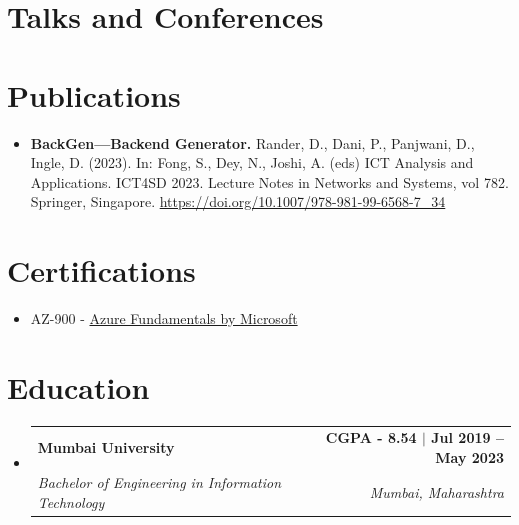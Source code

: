 \documentclass[letterpaper,11pt]{article}
\makeatletter
\newcommand{\resumeItem}[1]{
  \item\small{
    {#1 \vspace{-5pt}}
  }
}
\newcommand{\resumeSubheadingEdu}[4]{
  \vspace{0pt}\item
    \begin{tabular*}{1.0\textwidth}[t]{l@{\extracolsep{\fill}}r}
      \textbf{#1} & \textbf{\small #2} \\
      \textit{\small#3} & \textit{\small #4} \\
    \end{tabular*}\vspace{-9pt}
}
\newcommand{\resumeSubHeadingListStart}{\begin{itemize}[leftmargin=0.0in, label={}]}
\newcommand{\resumeSubHeadingListEnd}{\end{itemize}}
\newcommand{\resumeItemListStart}{\begin{itemize}}
\newcommand{\resumeItemListEnd}{\end{itemize}\vspace{-5pt}}
\makeatother
\begin{document}
\section{Talks and Conferences}
\resumeItemListStart
\resumeItemListEnd
 \vspace{-8pt}

\section{Publications}
\resumeItemListStart
    \resumeItem{\textbf{BackGen—Backend Generator.} Rander, D., Dani, P., Panjwani, D., Ingle, D. (2023). In: Fong, S., Dey, N., Joshi, A. (eds) ICT Analysis and Applications. ICT4SD 2023. Lecture Notes in Networks and Systems, vol 782. Springer, Singapore. \href{https://doi.org/10.1007/978-981-99-6568-7_34}{https://doi.org/10.1007/978-981-99-6568-7\_34 }}
\resumeItemListEnd
 \vspace{-8pt}

\section{Certifications}
\resumeItemListStart
    \resumeItem{AZ-900 - \href{https://learn.microsoft.com/api/credentials/share/en-us/DarshanRander-9336/507CF5137A394DED?sharingId=DB82F436CF25AA32}{Azure Fundamentals by Microsoft}}
\resumeItemListEnd
 \vspace{-8pt}

\section{Education}
  \resumeSubHeadingListStart
    \resumeSubheadingEdu
    {Mumbai University}{CGPA - 8.54 $|$ Jul 2019 -- May 2023}
      {Bachelor of Engineering in Information Technology}{Mumbai, Maharashtra}
  \resumeSubHeadingListEnd
\end{document}
